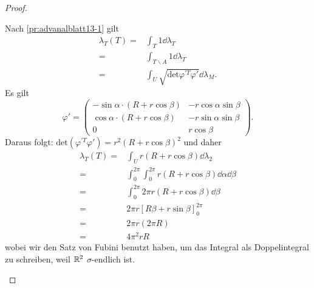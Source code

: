 \begin{proof}
\begin{parts}
	\item Nach \ref{pr:advanalblatt13-1} gilt
		\begin{align*}
			\lambda_T(T)=&\int_T 1\dd{\lambda_T}\\
			=&\int_{T\backslash A}1\dd{\lambda_T}\\
			=&\int_U  \sqrt{\text{det}\varphi^{\prime T}\varphi'} \dd{\lambda_M}.
		\end{align*}
		Es gilt
		\[
			\varphi'=\begin{pmatrix} -\sin\alpha\cdot (R+r\cos\beta) & -r\cos\alpha\sin\beta \\ \cos\alpha\cdot (R+r\cos\beta) & -r\sin\alpha\sin\beta \\ 0 & r\cos\beta \end{pmatrix} 
		.\] 
			Daraus folgt: $\text{det}(\varphi^{\prime T}\varphi')=r^2(R+r\cos\beta)^2$ und daher
			\begin{align*}
				\lambda_T(T)=&\int_U r(R+r\cos\beta)\dd{\lambda_2}\\
				=&\int_0^{2\pi}\int_0^{2\pi} r(R+r\cos\beta)\dd{\alpha}\dd{\beta}\\
				=&\int_0^{2\pi}2\pi r(R+r\cos\beta)\dd{\beta}\\
				=&2\pi r\left[ R\beta+r\sin\beta \right]_0^{2\pi}\\
				=&2\pi r(2\pi R)\\
				=&4\pi^2 rR
			\end{align*}
			wobei wir den Satz von Fubini benutzt haben, um das Integral als Doppelintegral zu schreiben, weil $\mathbb{R}^2$ $\sigma$-endlich ist.
	\end{parts}
\end{proof}
